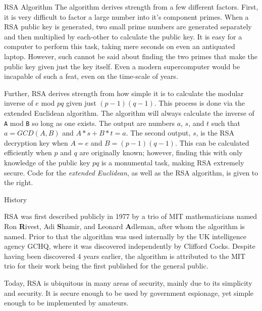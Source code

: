 \documentclass[landscape,fontscale=.8,paperwidth=24in,paperheight=18in]{baposter} %
\begin{document}
\begin{poster}
\begin{posterbox}[name=rsa,column=13,row=0,span=17]{RSA Algorithm}
The algorithm derives strength from  a few different factors. First, it is very difficult to factor a large number into it's component primes. When a RSA public key is generated, two small prime numbers are generated separately and then multiplied by each-other to calculate the public key. It is easy for a computer to perform this task, taking mere seconds on even an antiquated laptop. However, such cannot be said about finding the two primes that make the public key given just the key itself. Even a modern supercomputer would be incapable of such a feat, even on the time-scale of years.

Further, RSA derives strength from how simple it is to calculate the modular inverse of $e$ mod $pq$ given just $(p-1)(q-1)$. This process is done via the extended Euclidean algorithm. The algorithm will always calculate the inverse of \verb|A| mod \verb|B| so long as one exists. The output are numbers $a$, $s$, and $t$ such that $a = GCD(A,B)$ and $A*s + B*t = a$. The second output, $s$, is the RSA decryption key when $A=e$ and ${B=(p-1)(q-1)}$. This can be calculated efficiently when $p$ and $q$ are originally known; however, finding this with only knowledge of the public key $pq$ is a monumental task, making RSA extremely secure. Code for the \emph{extended Euclidean}, as well as the RSA algorithm, is given to the right.
\end{posterbox}



\begin{posterbox}[name=history, column=13, below=rsa,span=17]{History}
\begin{multicols}{2}
RSA was first described publicly in 1977 by a trio of MIT mathematicians named Ron \textbf{R}ivest, Adi \textbf{S}hamir, and Leonard \textbf{A}dleman, after whom the algorithm is named. Prior to that the algorithm was used internally by the UK intelligence agency GCHQ, where it was discovered independently by Clifford Cocks. Despite having been discovered 4 years earlier, the algorithm is attributed to the MIT trio for their work being the first published for the general public.

Today, RSA is ubiquitous in many areas of security, mainly due to its simplicity and security. It is secure enough to be used by government espionage, yet simple enough to be implemented by amateurs. 


\end{multicols}
\end{posterbox}
\end{poster}
\end{document}
